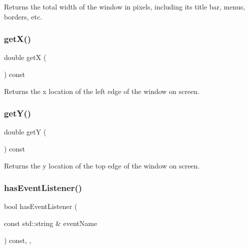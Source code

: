 Returns the total width of the window in pixels, including its title bar, menus, borders, etc. 

\mbox{\label{classGWindow_a344385751bee0720059403940d57a13e}} 
\subsubsection{\texorpdfstring{get\+X()}{getX()}}
{\footnotesize\ttfamily double getX (\begin{DoxyParamCaption}{ }\end{DoxyParamCaption}) const\hspace{0.3cm}{\ttfamily [virtual]}}



Returns the x location of the left edge of the window on screen. 

\mbox{\label{classGWindow_aafa51c7f8f38a09febbb9ce7853f77b4}} 
\subsubsection{\texorpdfstring{get\+Y()}{getY()}}
{\footnotesize\ttfamily double getY (\begin{DoxyParamCaption}{ }\end{DoxyParamCaption}) const\hspace{0.3cm}{\ttfamily [virtual]}}



Returns the y location of the top edge of the window on screen. 

\mbox{\label{classGObservable_a9f6faaa25942923bafa1c44020c49fa9}} 
\subsubsection{\texorpdfstring{has\+Event\+Listener()}{hasEventListener()}}
{\footnotesize\ttfamily bool has\+Event\+Listener (\begin{DoxyParamCaption}\item[{const std\+::string \&}]{event\+Name }\end{DoxyParamCaption}) const\hspace{0.3cm}{\ttfamily [protected]}, {\ttfamily [virtual]}, {\ttfamily [inherited]}}




